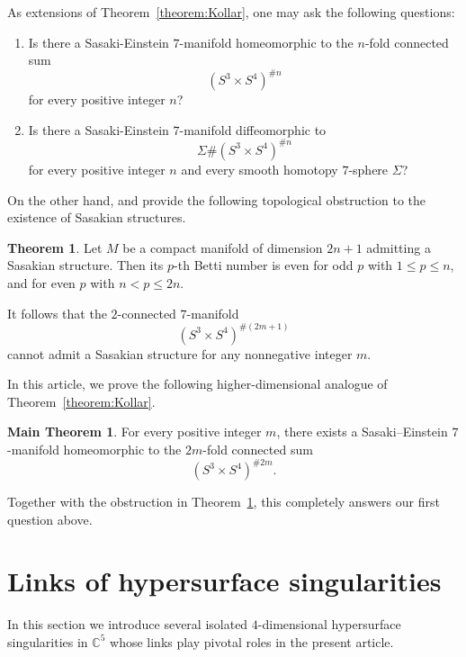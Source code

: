 \documentclass[12pt]{amsart}
\theoremstyle{definition}
\newtheorem{theorem}[equation]{Theorem}
\newtheorem*{theoremMAIN*}{Main Theorem}
\theoremstyle{remark}
\begin{document}
As extensions of Theorem~\ref{theorem:Kollar}, one may ask the following questions:
\begin{enumerate}


\item Is there a Sasaki-Einstein $7$-manifold homeomorphic to the $n$-fold connected sum 
\[
(S^3\times S^4)^{\#n}
\]
for every positive integer $n$?

\item Is there a Sasaki-Einstein $7$-manifold diffeomorphic to 
\[
\Sigma\#(S^3\times S^4)^{\#n}
\]
for every positive integer $n$ and every smooth homotopy $7$-sphere $\Sigma$?
\end{enumerate}

On the other hand, \cite[Theorem~4.4]{Fu66} and \cite[Theorem~1.3]{BG67} provide the following topological obstruction to the existence of Sasakian structures.

\begin{theorem}\label{theorem:ob}
Let $M$ be a compact manifold of dimension $2n+1$ admitting a Sasakian structure. Then its $p$-th Betti number is even for odd $p$ with $1\leq p\leq n$, and for even $p$ with $n < p\leq 2n$.
\end{theorem}

It follows that the $2$-connected $7$-manifold
\[
(S^3\times S^4)^{\#(2m+1)}
\]
cannot admit a Sasakian structure for any nonnegative integer $m$.


In this article, we prove the following higher-dimensional analogue of Theorem~\ref{theorem:Kollar}.

\begin{theoremMAIN*}
For every positive integer $m$, there exists a Sasaki--Einstein $7$-manifold homeomorphic to the $2m$-fold connected sum 
\[
(S^3\times S^4)^{\# 2m}.
\]
\end{theoremMAIN*}
Together with the obstruction in Theorem~\ref{theorem:ob}, this completely answers our first question above.


 \section{Links of hypersurface singularities}\label{section:orbifold}
  
  
  
In this section we introduce several isolated $4$-dimensional hypersurface singularities in $\mathbb{C}^5$ whose links play pivotal roles in the present article. 
\end{document}
